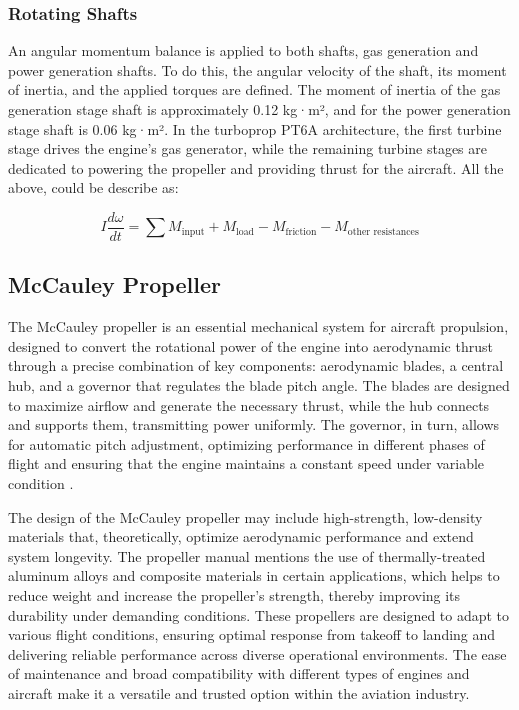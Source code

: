 \documentclass{Format}
\begin{document}
\subsubsection{Rotating Shafts}
An angular momentum balance is applied to both shafts, gas generation and power generation shafts. To do this, the angular velocity of the shaft, its moment of inertia, and the applied torques are defined. The moment of inertia of the gas generation stage shaft is approximately 0.12 kg·m², and for the power generation stage shaft is 0.06 kg·m². In the turboprop PT6A architecture, the first turbine stage drives the engine's gas generator, while the remaining turbine stages are dedicated to powering the propeller and providing thrust for the aircraft. All the above, could be describe as:

\begin{equation}
I \frac{d\omega}{dt} = \sum M_{\text{input}} + M_{\text{load}} - M_{\text{friction}} - M_{\text{other resistances}}
\end{equation}

\subsection{McCauley Propeller}

The McCauley propeller \cite{mccauley2023techguide} is an essential mechanical system for aircraft propulsion, designed to convert the rotational power of the engine into aerodynamic thrust through a precise combination of key components: aerodynamic blades, a central hub, and a governor that regulates the blade pitch angle. The blades are designed to maximize airflow and generate the necessary thrust, while the hub connects and supports them, transmitting power uniformly. The governor, in turn, allows for automatic pitch adjustment, optimizing performance in different phases of flight and ensuring that the engine maintains a constant speed under variable condition \cite{mccauley2023techguide}.

The design of the McCauley propeller may include high-strength, low-density materials that, theoretically, optimize aerodynamic performance and extend system longevity. The propeller manual \cite{mccauley2023techguide} mentions the use of thermally-treated aluminum alloys and composite materials in certain applications, which helps to reduce weight and increase the propeller's strength, thereby improving its durability under demanding conditions. These propellers \cite{mccauley2023techguide} are designed to adapt to various flight conditions, ensuring optimal response from takeoff to landing and delivering reliable performance across diverse operational environments. The ease of maintenance and broad compatibility with different types of engines and aircraft make it a versatile and trusted option within the aviation industry. 
\end{document}
